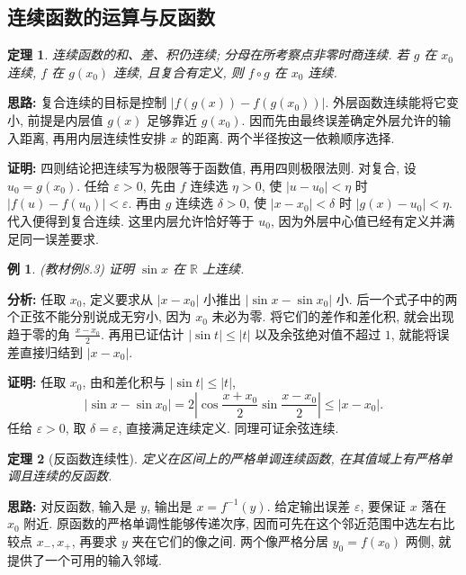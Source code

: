 \documentclass[UTF8,openany]{ctexbook}
\theoremstyle{chinesetextbook}
\newtheorem{example}{例}[section]
\newtheorem{theorem}{定理}[section]
\newenvironment{cnproof}{\par\indent\textbf{证明:} \ignorespaces}{\par}
\begin{document}
\subsection{连续函数的运算与反函数}
\begin{theorem}
连续函数的和、差、积仍连续; 分母在所考察点非零时商连续. 若 $g$ 在 $x_0$ 连续, $f$ 在 $g(x_0)$ 连续, 且复合有定义, 则 $f\circ g$ 在 $x_0$ 连续.
\end{theorem}
\par\indent\textbf{思路:} 复合连续的目标是控制 $|f(g(x))-f(g(x_0))|$. 外层函数连续能将它变小, 前提是内层值 $g(x)$ 足够靠近 $g(x_0)$. 因而先由最终误差确定外层允许的输入距离, 再用内层连续性安排 $x$ 的距离. 两个半径按这一依赖顺序选择.
\begin{cnproof}
四则结论把连续写为极限等于函数值, 再用四则极限法则. 对复合, 设 $u_0=g(x_0)$. 任给 $\varepsilon>0$, 先由 $f$ 连续选 $\eta>0$, 使 $|u-u_0|<\eta$ 时 $|f(u)-f(u_0)|<\varepsilon$. 再由 $g$ 连续选 $\delta>0$, 使 $|x-x_0|<\delta$ 时 $|g(x)-u_0|<\eta$. 代入便得到复合连续. 这里内层允许恰好等于 $u_0$, 因为外层中心值已经有定义并满足同一误差要求.
\end{cnproof}
\begin{example}
(教材例8.3) 证明 $\sin x$ 在 $\mathbb R$ 上连续.
\end{example}
\par\indent\textbf{分析:} 任取 $x_0$, 定义要求从 $|x-x_0|$ 小推出 $|\sin x-\sin x_0|$ 小. 后一个式子中的两个正弦不能分别说成无穷小, 因为 $x_0$ 未必为零. 将它们的差作和差化积, 就会出现趋于零的角 $\displaystyle\frac{x-x_0}{2}$. 再用已证估计 $|\sin t|\le|t|$ 以及余弦绝对值不超过 $1$, 就能将误差直接归结到 $|x-x_0|$.
\begin{cnproof}
任取 $x_0$, 由和差化积与 $|\sin t|\le|t|$,
\[
|\sin x-\sin x_0|
=2\left|\cos\frac{x+x_0}{2}\sin\frac{x-x_0}{2}\right|
\le|x-x_0|.
\]
任给 $\varepsilon>0$, 取 $\delta=\varepsilon$, 直接满足连续定义. 同理可证余弦连续.
\end{cnproof}
\begin{theorem}[反函数连续性]
定义在区间上的严格单调连续函数, 在其值域上有严格单调且连续的反函数.
\end{theorem}
\par\indent\textbf{思路:} 对反函数, 输入是 $y$, 输出是 $x=f^{-1}(y)$. 给定输出误差 $\varepsilon$, 要保证 $x$ 落在 $x_0$ 附近. 原函数的严格单调性能够传递次序, 因而可先在这个邻近范围中选左右比较点 $x_-,x_+$, 再要求 $y$ 夹在它们的像之间. 两个像严格分居 $y_0=f(x_0)$ 两侧, 就提供了一个可用的输入邻域.
\end{document}
